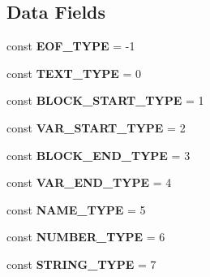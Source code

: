 \subsection*{Data Fields}
\begin{DoxyCompactItemize}
\item 
\hypertarget{class_twig___token_a8568089262d18bfd0fb76f3d783b15f0}{}const {\bfseries E\+O\+F\+\_\+\+T\+Y\+P\+E} = -\/1\label{class_twig___token_a8568089262d18bfd0fb76f3d783b15f0}

\item 
\hypertarget{class_twig___token_aa60308f9919cac81f3d6d8f0c61a1b7e}{}const {\bfseries T\+E\+X\+T\+\_\+\+T\+Y\+P\+E} = 0\label{class_twig___token_aa60308f9919cac81f3d6d8f0c61a1b7e}

\item 
\hypertarget{class_twig___token_aabd9adcf26fada59ef8f5a0be748f1c5}{}const {\bfseries B\+L\+O\+C\+K\+\_\+\+S\+T\+A\+R\+T\+\_\+\+T\+Y\+P\+E} = 1\label{class_twig___token_aabd9adcf26fada59ef8f5a0be748f1c5}

\item 
\hypertarget{class_twig___token_a20be04a5646a40886dfa4b824f2f43f6}{}const {\bfseries V\+A\+R\+\_\+\+S\+T\+A\+R\+T\+\_\+\+T\+Y\+P\+E} = 2\label{class_twig___token_a20be04a5646a40886dfa4b824f2f43f6}

\item 
\hypertarget{class_twig___token_af7d3a5dbc1cdaae75625ef1383029251}{}const {\bfseries B\+L\+O\+C\+K\+\_\+\+E\+N\+D\+\_\+\+T\+Y\+P\+E} = 3\label{class_twig___token_af7d3a5dbc1cdaae75625ef1383029251}

\item 
\hypertarget{class_twig___token_a90edfcf33c8637deddaa97a0f89d7f1e}{}const {\bfseries V\+A\+R\+\_\+\+E\+N\+D\+\_\+\+T\+Y\+P\+E} = 4\label{class_twig___token_a90edfcf33c8637deddaa97a0f89d7f1e}

\item 
\hypertarget{class_twig___token_a5dde6b9e81eb5c8dd046842570c5dab4}{}const {\bfseries N\+A\+M\+E\+\_\+\+T\+Y\+P\+E} = 5\label{class_twig___token_a5dde6b9e81eb5c8dd046842570c5dab4}

\item 
\hypertarget{class_twig___token_a0053ba5957db87c3549cd18418ddc7ec}{}const {\bfseries N\+U\+M\+B\+E\+R\+\_\+\+T\+Y\+P\+E} = 6\label{class_twig___token_a0053ba5957db87c3549cd18418ddc7ec}

\item 
\hypertarget{class_twig___token_a8f9407ce6f57b891a8bd3dc9a2614cb5}{}const {\bfseries S\+T\+R\+I\+N\+G\+\_\+\+T\+Y\+P\+E} = 7\label{class_twig___token_a8f9407ce6f57b891a8bd3dc9a2614cb5}


\end{DoxyCompactItemize}
